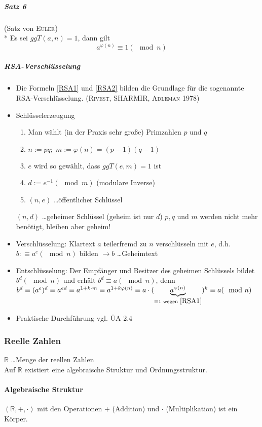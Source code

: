 \documentclass[a4paper]{scrartcl}
\begin{document}
\subparagraph{Satz 6} (Satz von \textsc{Euler})\\*
Es sei $ggT(a,n)=1$, dann gilt \begin{equation} \label{RSA2} a^{\varphi (n)} \equiv 1 (\mod{n})\end{equation}

\subparagraph{RSA-Verschlüsselung}
\begin{itemize}
\item Die Formeln \ref{RSA1} und \ref{RSA2} bilden die Grundlage für die sogenannte RSA-Verschlüsselung. (\textsc{Rivest, SHARMIR, Adleman 1978})
\item Schlüsselerzeugung
\begin{enumerate}
\item Man wählt (in der Praxis sehr große) Primzahlen $p$ und $q$
\item $n:= p q; \; m:=\varphi (n)=(p-1)(q-1)$
\item $e$ wird so gewählt, dass $ggT(e,m)=1$ ist
\item $d:=e^{-1} (\mod{m})$ (modulare Inverse)
\item $(n,e)$ \dots öffentlicher Schlüssel
\end{enumerate}
$(n,d)$ \dots geheimer Schlüssel (geheim ist nur $d$) $p,q$ und $m$ werden nicht mehr benötigt, bleiben aber geheim!
\item Verschlüsselung: Klartext $a$ teilerfremd zu $n$ verschlüsseln mit $e$, d.h. $b:\equiv a^e (\mod{n})$ bilden $\rightarrow b$ \dots Geheimtext
\item Entschlüsselung: Der Empfänger und Besitzer des geheimen Schlüssels bildet $b^d (\mod{n})$ und erhält $b^d \equiv a (\mod{n})$, denn $b^d\equiv (a^e)^d\equiv a^{ed}\equiv a^{1+k\cdot m} \equiv a^{1+k\varphi (n)} \equiv a\cdot (\underbrace{a^{\varphi (n)}}_{\equiv 1 \text{ wegen } \ref{RSA1}})^k \equiv a (\mod{n})$
\item Praktische Durchführung vgl. ÜA 2.4
\end{itemize}

\subsubsection{Reelle Zahlen}
$\mathbb{R}$ \dots Menge der reellen Zahlen\\
Auf $\mathbb{R}$ existiert eine algebraische Struktur und Ordnungsstruktur.

\paragraph{Algebraische Struktur}
$(\mathbb{R},+,\cdot )$ mit den Operationen $+$ (Addition) und $\cdot $ (Multiplikation) ist ein Körper.
\end{document}

